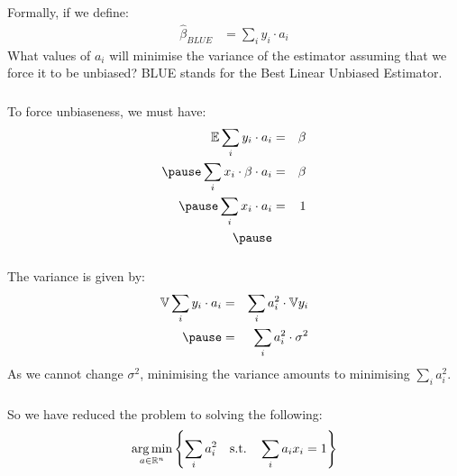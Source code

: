 \begin{frame}[fragile] \frametitle{}

Formally, if we define:
\begin{align*}
\widehat{\beta}_{BLUE} &= \sum_i y_i \cdot a_i
\end{align*}
What values of $a_i$ will minimise the variance of the
estimator assuming that we force it to be unbiased? BLUE
stands for the Best Linear Unbiased Estimator.

\end{frame}

\begin{frame}[fragile] \frametitle{}

To force unbiaseness, we must have:
\begin{eqnarray*}
\mathbb{E} \sum_i y_i \cdot a_i &=& \beta \\ \pause
\sum_i x_i \cdot \beta \cdot a_i &=& \beta \\ \pause
\sum_i x_i \cdot a_i &=& 1 \\ \pause
\end{eqnarray*}

\end{frame}

\begin{frame}[fragile] \frametitle{}

The variance is given by:
\begin{eqnarray*}
\mathbb{V} \sum_i y_i \cdot a_i &=& \sum_i a_i^2 \cdot \mathbb{V} y_i \\ \pause
&=& \sum_i a_i^2 \cdot \sigma^2
\end{eqnarray*}
As we cannot change $\sigma^2$, minimising the variance
amounts to minimising $\sum_i a_i^2$.

\end{frame}

\begin{frame}[fragile] \frametitle{}

So we have reduced the problem to solving the following:
\begin{align*}
\mathop{\mathrm{arg\,min}}_{a \in \mathbb{R}^n} \left\{ \sum_i a_i^2 \quad \text{s.t.} \quad \sum_i a_i x_i = 1 \right\}
\end{align*}

\end{frame}

